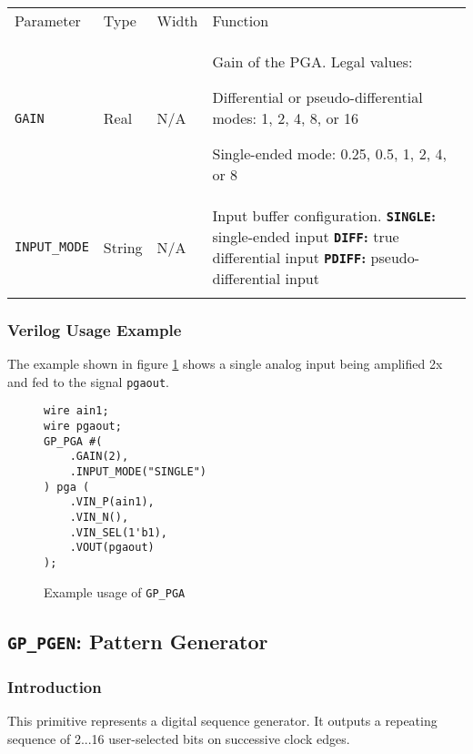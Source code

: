 \documentclass[11pt]{article}
\newcommand{\tokenstyle}[1]{\texttt{#1}}
\newcommand{\wirestyle}[1]{\texttt{#1}}
\newcommand{\valuestyle}[1]{\texttt{#1}}
\newcommand{\strvaluestyle}[1]{\valuestyle{\textquotedbl#1\textquotedbl}}
\newcommand{\strexamplestyle}[1]{\textbf{\strvaluestyle{#1}:}}
\newcommand{\whenstyle}[1]{{\fontseries{sb}\selectfont#1}}
\newcommand{\thinhline}{\Xhline{1\arrayrulewidth}}
\newcommand{\thickhline}{\Xhline{2.5\arrayrulewidth}}
\newcommand{\novspace}{\vspace*{-\baselineskip}}
\begin{document}
\begin{tabularx}{\textwidth}{lllX}
\thinhline
\whenstyle{Parameter} & \whenstyle{Type} & \whenstyle{Width} & \whenstyle{Function} \\
\thickhline
\tokenstyle{GAIN} & Real & N/A &
	Gain of the PGA. Legal values:
	\begin{compactitem}
		\item Differential or pseudo-differential modes: 1, 2, 4, 8, or 16
		\item Single-ended mode: 0.25, 0.5, 1, 2, 4, or 8\novspace
	\end{compactitem}\\
\thinhline
\tokenstyle{INPUT\_MODE} & String & N/A &
	Input buffer configuration. \newline
	\strexamplestyle{SINGLE} single-ended input \newline
	\strexamplestyle{DIFF} true differential input \newline
	\strexamplestyle{PDIFF} pseudo-differential input
\\
\thinhline
\end{tabularx}

\subsubsection{Verilog Usage Example}

The example shown in figure \ref{gp-pga-example} shows a single analog input being amplified 2x and fed to the signal
\wirestyle{pgaout}.

\begin{figure}[h]
\begin{lstlisting}
wire ain1;
wire pgaout;
GP_PGA #(
	.GAIN(2),
	.INPUT_MODE("SINGLE")
) pga (
	.VIN_P(ain1),
	.VIN_N(),
	.VIN_SEL(1'b1),
	.VOUT(pgaout)
);
\end{lstlisting}
\caption{Example usage of \tokenstyle{GP\_PGA}}
\label{gp-pga-example}
\end{figure}


\pagebreak
\clearpage
\subsection{\tokenstyle{GP\_PGEN}: Pattern Generator}
\label{gp-pgen}

\subsubsection{Introduction}
This primitive represents a digital sequence generator. It outputs a repeating sequence of 2...16 user-selected bits
on successive clock edges.
\end{document}
